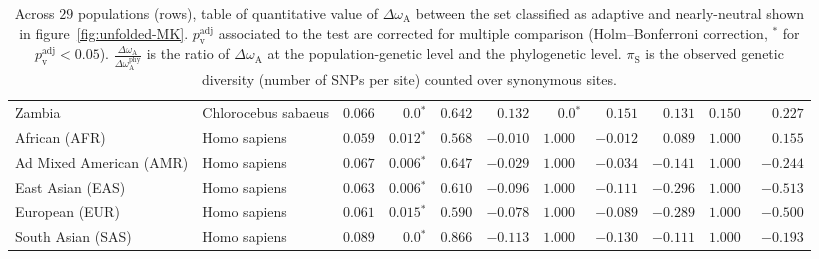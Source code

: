 \documentclass{article}
\begin{document}
\begin{table*}[!ht]
\begin{adjustbox}{width = 1\textwidth}
\begin{tabular}{||l|l||r|r|r||r|r|r||r|r|r||}
                \rowcolor{LIGHTGREY} Zambia                         & Chlorocebus sabaeus & $ 0.066$ & $\bm{0.0{^*}}$    & $ 0.642$                                                                     & $ 0.132$                      & $\bm{0.0{^*}}$ & $ 0.151$ & $ 0.131$ & $ 0.150~~$ & $ 0.227$ \\
                African (AFR)                                       & Homo sapiens        & $ 0.059$ & $\bm{ 0.012{^*}}$ & $ 0.568$ & $-0.010$ & $ 1.000~~$ & $-0.012$ & $ 0.089$ & $ 1.000~~$ & $ 0.155$ \\
                Ad Mixed American (AMR)                             & Homo sapiens        & $ 0.067$ & $\bm{ 0.006{^*}}$ & $ 0.647$ & $-0.029$ & $ 1.000~~$ & $-0.034$ & $-0.141$ & $ 1.000~~$ & $-0.244$ \\
                East Asian (EAS)                                    & Homo sapiens        & $ 0.063$ & $\bm{ 0.006{^*}}$ & $ 0.610$ & $-0.096$ & $ 1.000~~$ & $-0.111$ & $-0.296$ & $ 1.000~~$ & $-0.513$ \\
                European (EUR)                                      & Homo sapiens        & $ 0.061$ & $\bm{ 0.015{^*}}$ & $ 0.590$ & $-0.078$ & $ 1.000~~$ & $-0.089$ & $-0.289$ & $ 1.000~~$ & $-0.500$ \\
                South Asian (SAS)                                   & Homo sapiens        & $ 0.089$ & $\bm{0.0{^*}}$    & $ 0.866$ & $-0.113$ & $ 1.000~~$ & $-0.130$ & $-0.111$ & $ 1.000~~$ & $-0.193$ \\
                \bottomrule
            \end{tabular}
        \end{adjustbox}
        \caption{
            Across $29$ populations (rows), table of quantitative value of $\Delta \omega_{\mathrm{A}}$ between the set classified as adaptive and nearly-neutral shown in figure~\ref{fig:unfolded-MK}.
            $p_{\mathrm{v}}^{\mathrm{adj}}$ associated to the test are corrected for multiple comparison (Holm–Bonferroni correction, $^*$ for $p_{\mathrm{v}}^{\mathrm{adj}} < 0.05$).
            $\frac{\Delta\omega_{\mathrm{A}}}{\Delta\omega_{\mathrm{A}}^{\mathrm{phy}}}$ is the ratio of $\Delta \omega_{\mathrm{A}}$ at the population-genetic level and the phylogenetic level.
            $\pi_{\textrm{S}}$ is the observed genetic diversity (number of SNPs per site) counted over synonymous sites.
        }
        \label{table:unfolded-MK}
    \end{table*}
\end{document}
